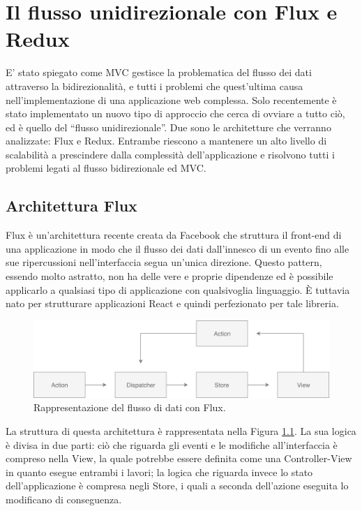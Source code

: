 \chapter{Il flusso unidirezionale con Flux e Redux}
E' stato spiegato come MVC gestisce la problematica del flusso dei dati attraverso la bidirezionalità, e tutti i problemi che quest'ultima causa nell'implementazione di una applicazione web complessa. Solo recentemente è stato implementato un nuovo tipo di approccio che cerca di ovviare a tutto ciò, ed è quello del “flusso unidirezionale”. Due sono le architetture che verranno analizzate: Flux e Redux. Entrambe riescono a mantenere un alto livello di scalabilità a prescindere dalla complessità dell'applicazione e risolvono tutti i problemi legati al flusso bidirezionale ed MVC.

\section{Architettura Flux}
\label{FluxArchitecture}
Flux è un'architettura recente creata da Facebook che struttura il front-end di una applicazione in modo che il flusso dei dati dall'innesco di un evento fino alle sue ripercussioni nell'interfaccia segua un'unica direzione.
Questo pattern, essendo molto astratto, non ha delle vere e proprie dipendenze ed è possibile applicarlo a qualsiasi tipo di applicazione con qualsivoglia linguaggio. È tuttavia nato per strutturare applicazioni React e quindi perfezionato per tale libreria.

\begin{figure}[h]
\centering
\vspace*{0.5cm} 
\includegraphics[width=14cm]{./images/FluxWorkflow}
\caption{Rappresentazione del flusso di dati con Flux.}
\label{FluxWorkflow}
\vspace*{0.5cm} 
\end{figure}

La struttura di questa architettura è rappresentata nella Figura \ref{FluxWorkflow}. La sua logica è divisa in due parti: ciò che riguarda gli eventi e le modifiche all'interfaccia è compreso nella View, la quale potrebbe essere definita come una Controller-View in quanto esegue entrambi i lavori; la logica che riguarda invece lo stato dell'applicazione è compresa negli Store, i quali a seconda dell'azione eseguita lo modificano di conseguenza.

